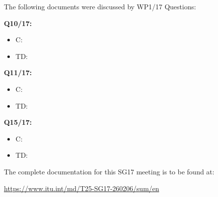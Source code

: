 The following documents were discussed by WP1/17 Questions:

\textbf{Q10/17:}

\begin{itemize}
  \item C: 
  \item TD: 
\end{itemize}

\textbf{Q11/17:}

\begin{itemize}
  \item C: 
  \item TD: 
\end{itemize}

\textbf{Q15/17:}

\begin{itemize}
  \item C: 
  \item TD: 
\end{itemize}

The complete documentation for this SG17 meeting is to be found at:

\href{https://www.itu.int/md/T25-SG17-260206/sum/en}{https://www.itu.int/md/T25-SG17-260206/sum/en}
